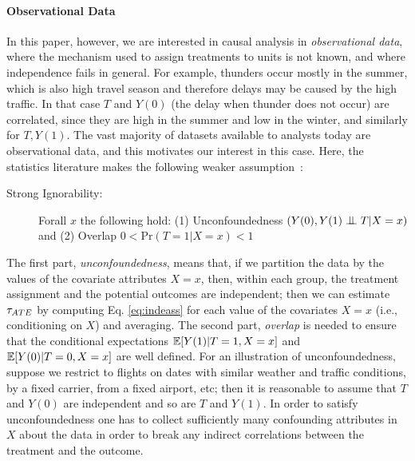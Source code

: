 \paragraph*{Observational Data}
In this paper, however, we are interested in causal analysis in {\em
  observational data}, where the mechanism used to assign treatments
to units is not known, and where independence fails in general.  For
example, thunders occur mostly in the summer, which is also high
travel season and therefore delays may be caused by the high traffic.
In that case $T$ and $Y(0)$ (the delay when thunder does not occur)
are correlated, since they are high in the summer and low in the
winter, and similarly for $T,Y(1)$.  The vast majority of datasets
available to analysts today are observational data, and this motivates
our interest in this case.  Here, the statistics literature makes the
following weaker assumption~\cite{Rubin1983b}:
\vspace{-0.1cm}
\begin{description}
\item[Strong Ignorability:] Forall $x$ the following hold: \newline
  (1) Unconfoundedness $({Y(0), Y(1) \bigCI T} | X=x)$ and \newline
  (2) Overlap $0 < \textrm{Pr}(T = 1 | X=x) < 1$
\end{description}

The first part, {\em unconfoundedness}, means that, if we partition
the data by the values of the covariate attributes $X=x$, then, within
each group, the treatment assignment and the potential outcomes are independent; then we can
estimate ${\tau_{ATE}}$ by computing Eq. \ref{eq:indeass} for each value of
the covariates $X=x$ (i.e., conditioning on $X$) and averaging.  The
second part, {\em overlap} is needed to ensure that the conditional
expectations $\mathbb{E}[Y(1)|T=1,X=x]$ and $\mathbb{E}[Y(0)|T=0,X=x]$ are well
defined.  For an illustration of unconfoundedness, suppose we restrict
to flights on dates with similar weather and traffic conditions, by a
fixed carrier, from a fixed airport, etc; then it is reasonable to
assume that $T$ and $Y(0)$ are independent and so are $T$ and $Y(1)$.
In order to satisfy unconfoundedness one has to collect sufficiently
many confounding attributes in $X$ about the data in order to break
any indirect correlations between the treatment and the outcome.



